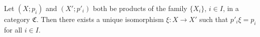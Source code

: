 Let $(X; p_i)$ and $(X'; p'_i)$ both be products of the family $\{X_i\}$, $i \in I$, in a category $\mathfrak{C}$. Then there exists a unique isomorphism $\xi: X \to X'$ such that $p'_i \xi = p_i$ for all $i \in I$.
